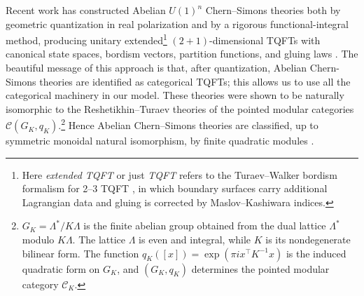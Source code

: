 \documentclass[12pt]{amsart}
\numberwithin{equation}{section}
\theoremstyle{definition}
\begin{document}
Recent work has constructed Abelian $U(1)^n$ Chern--Simons theories both by geometric quantization in real polarization and by a rigorous functional-integral method, producing unitary extended\footnote{Here \textit{extended TQFT} or just \textit{TQFT} refers to the Turaev--Walker bordism formalism for 2--3 TQFT \cite{Walker, Turaev1994}, in which boundary surfaces carry additional Lagrangian data and gluing is corrected by Maslov--Kashiwara indices.} $(2+1)$-dimensional TQFTs with canonical state spaces, bordism vectors, partition functions, and gluing laws \cite{Galviz2,Galviz2.5}.  The beautiful message of this approach is that, after quantization,  Abelian Chern-Simons theories are identified as categorical TQFTs; this allows us to use all the categorical machinery in our model. These theories were shown to be naturally isomorphic to the Reshetikhin--Turaev theories of the pointed modular categories $\mathcal C(G_K,q_K)$.\footnote{$G_K=\Lambda^*/K\Lambda$ is the finite abelian group obtained from the dual lattice $\Lambda^*$ modulo $K\Lambda$. The lattice $\Lambda$ is even and integral, while $K$ is its nondegenerate bilinear form. The function $q_K([x])=\exp(\pi i x^\top K^{-1}x)$ is the induced quadratic form on $G_K$, and $(G_K,q_K)$ determines the pointed modular category $\mathcal C_K$.
} Hence Abelian Chern--Simons theories are classified, up to symmetric monoidal natural isomorphism, by finite quadratic modules \cite{Galviz1, Galviz3,Galviz4}. 
\end{document}
